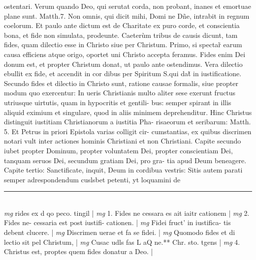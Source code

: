 \documentclass{article}
\begin{document}
\begin{pages}
ostentari. Verum quando Deo, qui serutat corda, non probant, inanes et emortuae plane sunt. Matth.7. Non omnis, qui dicit mihi, Domi ne Dñe, intrabit in regnum coelorum. Et paulo ante dictum est de Charitate ex puro corde, et conscientia bona, et fide non simulata, prodeunte. Caeterùm tribus de causis dicunt, tam fides, quam dilectio esse in Christo siue per Christum. Primo, si spectar̃ earum causa efficiens atque  origo, oportet uni Christo accepta feramus. Fides enim Dei donum est, et propter Christum donat, ut paulo ante ostendimus. Vera dilectio ebullit ex fide, et accendit in cor dibus per Spiritum S.qui dat̃ in iustificatione. Secundo fides et dilectio in Christo sunt, ratione causae formalis, siue propter modum quo exercentur: In ueris Christianis multo aliter sese exerunt fructus utriusque uirtutis, quam in hypocritis et gentili- bus: semper spirant in illis aliquid eximium et singulare, quod in aliis minimem deprehenditur. Hinc Christus distinguit iustitiam Christianorum a iustitia Pha- risaeorum et seribarum: Matth. 5. Et Petrus in priori Epistola varias colligit cir- cumstantias, ex quibus discrimen notari vult inter actiones hominis Christiani et non Christiani. Capite secundo iubet propter Dominum, propter voluntatem Dei, propter conscientiam Dei, tanquam seruos Dei, secundum gratiam Dei, pro gra- tia apud Deum beneagere. Capite tertio: Sanctificate, inquit, Deum in cordibua vestris: Sitis autem parati semper adrespondendum cuslsbet petenti, yt loquamini de  \pend
\vspace{0.5cm}\noindent
\vspace{0.2cm}\rule{1cm}{0.2pt}\\ 
\hspace{0.2cm}\textit{mg}
\footnotesize rides ex d qo peco. tingil 
\normalsize| 
\hspace{0.2cm}\textit{mg}
\footnotesize 1. Fides ne cessara es ait iaitr cationem 
\normalsize| 
\hspace{0.2cm}\textit{mg}
\footnotesize 2. Fides ne- cessaria est post iustifi- cationen. 
\normalsize| 
\hspace{0.2cm}\textit{mg}
\footnotesize Fidei fruct' in iustifica- tis debent clucere. 
\normalsize| 
\hspace{0.2cm}\textit{mg}
\footnotesize Discrimen uerae et fa se fidei. 
\normalsize| 
\hspace{0.2cm}\textit{mg}
\footnotesize Quomodo fides et di lectio sit pel Christum, 
\normalsize| 
\hspace{0.2cm}\textit{mg}
\footnotesize Cusac udls fas L aQ ne.** Chr. sto. tgens 
\normalsize| 
\hspace{0.2cm}\textit{mg}
\footnotesize 4. Christus est, proptes quem fides donatur a Deo. 
\normalsize| 

\end{pages}
\end{document}
